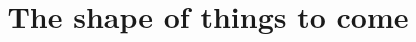 \documentclass{ximera}
\title{The shape of things to come}
\begin{document}
\begin{abstract}
\end{abstract}
\maketitle
\end{document}
